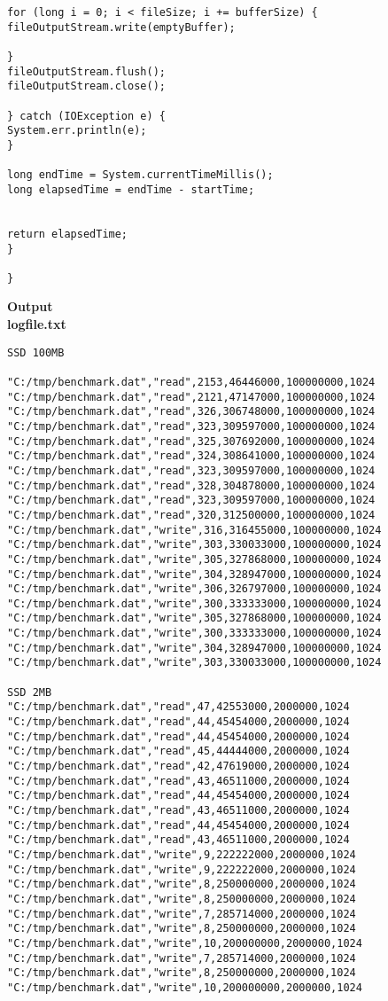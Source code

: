 \documentclass{article}
\begin{document}
\begin{lstlisting}
for (long i = 0; i < fileSize; i += bufferSize) {
fileOutputStream.write(emptyBuffer);

}
fileOutputStream.flush();
fileOutputStream.close();

} catch (IOException e) {
System.err.println(e);
}

long endTime = System.currentTimeMillis();
long elapsedTime = endTime - startTime;


return elapsedTime;
}

}

\end{lstlisting}
\textbf{Output}
\\
\textbf{logfile.txt}
\begin{lstlisting}
SSD 100MB

"C:/tmp/benchmark.dat","read",2153,46446000,100000000,1024
"C:/tmp/benchmark.dat","read",2121,47147000,100000000,1024
"C:/tmp/benchmark.dat","read",326,306748000,100000000,1024
"C:/tmp/benchmark.dat","read",323,309597000,100000000,1024
"C:/tmp/benchmark.dat","read",325,307692000,100000000,1024
"C:/tmp/benchmark.dat","read",324,308641000,100000000,1024
"C:/tmp/benchmark.dat","read",323,309597000,100000000,1024
"C:/tmp/benchmark.dat","read",328,304878000,100000000,1024
"C:/tmp/benchmark.dat","read",323,309597000,100000000,1024
"C:/tmp/benchmark.dat","read",320,312500000,100000000,1024
"C:/tmp/benchmark.dat","write",316,316455000,100000000,1024
"C:/tmp/benchmark.dat","write",303,330033000,100000000,1024
"C:/tmp/benchmark.dat","write",305,327868000,100000000,1024
"C:/tmp/benchmark.dat","write",304,328947000,100000000,1024
"C:/tmp/benchmark.dat","write",306,326797000,100000000,1024
"C:/tmp/benchmark.dat","write",300,333333000,100000000,1024
"C:/tmp/benchmark.dat","write",305,327868000,100000000,1024
"C:/tmp/benchmark.dat","write",300,333333000,100000000,1024
"C:/tmp/benchmark.dat","write",304,328947000,100000000,1024
"C:/tmp/benchmark.dat","write",303,330033000,100000000,1024

SSD 2MB
"C:/tmp/benchmark.dat","read",47,42553000,2000000,1024
"C:/tmp/benchmark.dat","read",44,45454000,2000000,1024
"C:/tmp/benchmark.dat","read",44,45454000,2000000,1024
"C:/tmp/benchmark.dat","read",45,44444000,2000000,1024
"C:/tmp/benchmark.dat","read",42,47619000,2000000,1024
"C:/tmp/benchmark.dat","read",43,46511000,2000000,1024
"C:/tmp/benchmark.dat","read",44,45454000,2000000,1024
"C:/tmp/benchmark.dat","read",43,46511000,2000000,1024
"C:/tmp/benchmark.dat","read",44,45454000,2000000,1024
"C:/tmp/benchmark.dat","read",43,46511000,2000000,1024
"C:/tmp/benchmark.dat","write",9,222222000,2000000,1024
"C:/tmp/benchmark.dat","write",9,222222000,2000000,1024
"C:/tmp/benchmark.dat","write",8,250000000,2000000,1024
"C:/tmp/benchmark.dat","write",8,250000000,2000000,1024
"C:/tmp/benchmark.dat","write",7,285714000,2000000,1024
"C:/tmp/benchmark.dat","write",8,250000000,2000000,1024
"C:/tmp/benchmark.dat","write",10,200000000,2000000,1024
"C:/tmp/benchmark.dat","write",7,285714000,2000000,1024
"C:/tmp/benchmark.dat","write",8,250000000,2000000,1024
"C:/tmp/benchmark.dat","write",10,200000000,2000000,1024





\end{lstlisting}
\end{document}
